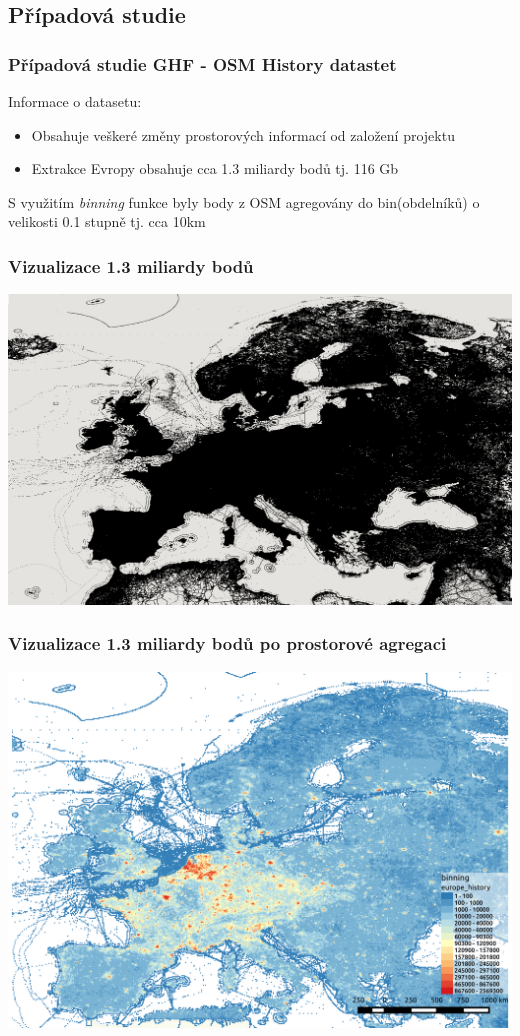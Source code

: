 \documentclass[unicode,bookmarksnumbered]{beamer}
\begin{document}
	\subsection{Případová studie}		
		\begin{frame}
			\frametitle{Případová studie GHF - OSM History datastet}
			Informace o datasetu:
			\begin{itemize}
				\item  Obsahuje veškeré změny prostorových informací od založení projektu
				\item  Extrakce Evropy obsahuje cca 1.3 miliardy bodů tj. 116 Gb
			\end{itemize}
			S využitím \textit{binning} funkce byly body z OSM agregovány do bin(obdelníků) o velikosti 0.1 stupně tj. cca 10km
		\end{frame}	
			
		\begin{frame}
			\frametitle{Vizualizace 1.3 miliardy bodů}
			\centering
			\includegraphics[width=1\textwidth]{./img/motivace/eu_all.png}
		\end{frame}
	
		\begin{frame}
			\frametitle{Vizualizace 1.3 miliardy bodů po prostorové agregaci}
			\centering
			\includegraphics[width=1\textwidth]{./img/spatial/history.png}
		\end{frame}
	
\end{document}
